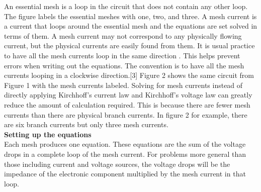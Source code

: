 \documentclass[letterpaper]{article}
\begin{document}
An essential mesh is a loop in the circuit that does not contain any other loop. The figure labels 
the essential meshes with one, two, and three.
A mesh current is a current that loops around the essential mesh and the equations are set solved in terms 
of them. A mesh current may not correspond to any physically flowing current, but the physical currents are 
easily found from them. It is usual practice to have all the mesh currents loop in the same direction
. This helps prevent errors when writing out the equations. The convention is to have all the mesh currents looping 
in a clockwise direction.[3] Figure 2 shows the same circuit from Figure 1 with the mesh currents 
labeled.
Solving for mesh currents instead of directly applying Kirchhoff's current law and Kirchhoff's voltage law can 
greatly reduce the amount of calculation required. This is because there are fewer mesh currents than there are physical 
branch currents. In figure 2 for example, there are six branch currents but only three mesh
currents.\\[1ex]
{\large\textbf{Setting up the equations}}\\[2ex]
Each mesh produces one equation. These equations are the sum of the voltage drops in a complete loop of 
the mesh current. For problems more general than those including current and voltage sources, the voltage drops will 
be the impedance of the electronic component multiplied by the mesh current in that loop.
\end{document}
